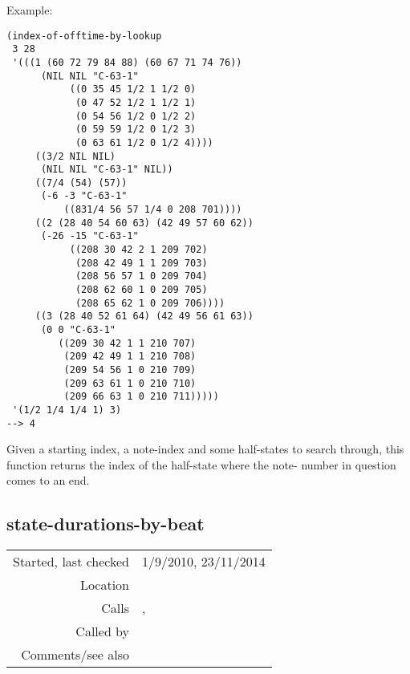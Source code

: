 \vspace{0.5cm}
\noindent Example:
\begin{verbatim}
(index-of-offtime-by-lookup
 3 28
 '(((1 (60 72 79 84 88) (60 67 71 74 76))
      (NIL NIL "C-63-1"
           ((0 35 45 1/2 1 1/2 0)
            (0 47 52 1/2 1 1/2 1)
            (0 54 56 1/2 0 1/2 2)
            (0 59 59 1/2 0 1/2 3)
            (0 63 61 1/2 0 1/2 4))))
     ((3/2 NIL NIL)
      (NIL NIL "C-63-1" NIL))
     ((7/4 (54) (57))
      (-6 -3 "C-63-1"
          ((831/4 56 57 1/4 0 208 701))))
     ((2 (28 40 54 60 63) (42 49 57 60 62))
      (-26 -15 "C-63-1"
           ((208 30 42 2 1 209 702)
            (208 42 49 1 1 209 703)
            (208 56 57 1 0 209 704)
            (208 62 60 1 0 209 705)
            (208 65 62 1 0 209 706))))
     ((3 (28 40 52 61 64) (42 49 56 61 63))
      (0 0 "C-63-1"
         ((209 30 42 1 1 210 707)
          (209 42 49 1 1 210 708)
          (209 54 56 1 0 210 709)
          (209 63 61 1 0 210 710)
          (209 66 63 1 0 210 711)))))
 '(1/2 1/4 1/4 1) 3)
--> 4
\end{verbatim}

\noindent Given a starting index, a note-index and
some half-states to search through, this function
returns the index of the half-state where the note-
number in question comes to an end.


\subsection*{state-durations-by-beat}\label{fun:state-durations-by-beat}

\vspace{0.3cm}
\begin{tabular}{r|p{8cm}}
Started, last checked & 1/9/2010, 23/11/2014 \\
Location & \nameref{sec:realising-states} \\
Calls & \nameref{fun:min-item}, \nameref{fun:nth-list-of-lists} \\
Called by & \nameref{fun:states2datapoints-by-lookup} \\
Comments/see also & \nameref{fun:state-durations}
\end{tabular}

